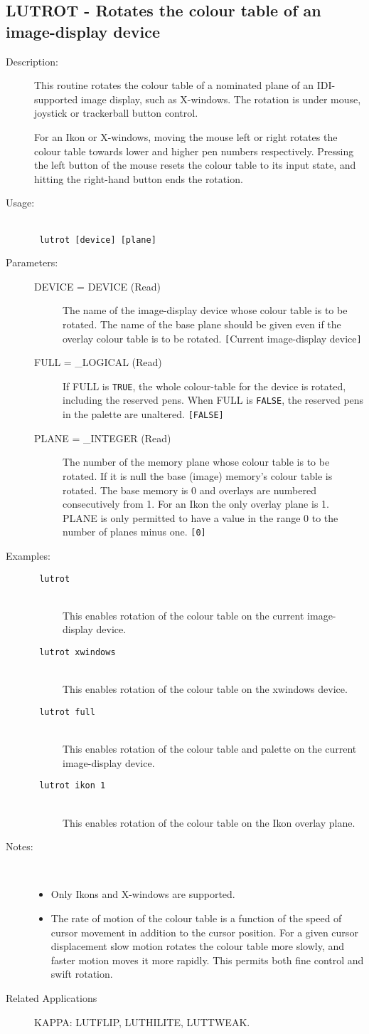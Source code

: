 \documentclass[twoside,11pt]{article}
\newcommand{\stardocinitials}  {SUN}
\newcommand{\stardocnumber}    {239.2}
\newcommand{\stardocname}{\stardocinitials /\stardocnumber}
\newcommand{\htmlref}[2]{#1}
\newcommand{\xlabel}[1]{}
\newlength{\sstbannerlength}
\newlength{\sstcaptionlength}
\newlength{\sstexampleslength}
\newlength{\sstexampleswidth}
\newcommand{\sstroutine}[3]{
   \goodbreak
   \markboth{{\stardocname}~ --- #1}{{\stardocname}~ --- #1}
   \rule{\textwidth}{0.5mm}
   \vspace{-7ex}
   \newline
   \settowidth{\sstbannerlength}{{\Large {\bf #1}}}
   \setlength{\sstcaptionlength}{\textwidth}
   \setlength{\sstexampleslength}{\textwidth}
   \addtolength{\sstbannerlength}{0.5em}
   \addtolength{\sstcaptionlength}{-2.0\sstbannerlength}
   \addtolength{\sstcaptionlength}{-4.9pt}
   \settowidth{\sstexampleswidth}{{\bf Examples:}}
   \addtolength{\sstexampleslength}{-\sstexampleswidth}
   \parbox[t]{\sstbannerlength}{\flushleft{\Large {\bf #1}}}
   \parbox[t]{\sstcaptionlength}{\center{\Large #2}}
   \parbox[t]{\sstbannerlength}{\flushright{\Large {\bf #1}}}
   \begin{description}
      #3
   \end{description}
}
\newcommand{\sstdescription}[1]{\item[Description:] #1}
\newcommand{\sstusage}[1]{\pagebreak[3] \item[Usage:] \mbox{} \\[1.3ex] {\ssttt #1}}
\newcommand{\sstparameters}[1]{
   \goodbreak 
   \item[Parameters:] \mbox{} \\
   \vspace{-3.5ex}
   \begin{description}
      #1
   \end{description}
}
\newcommand{\sstexamples}[1]{
   \goodbreak
   \item[Examples:] \mbox{} \\
   \vspace{-3.5ex}
   \begin{description}
      #1
   \end{description}
}
\newcommand{\sstsubsection}[1]{ \item[{#1}] \mbox{} \\}
\newcommand{\sstexamplesubsection}[2]{\sloppy \item{\ssttt #1} \mbox{} \\ #2 }
\newcommand{\sstnotes}[1]{\pagebreak[3] \item[Notes:] \mbox{} \\[1.3ex] #1}
\newcommand{\sstdiytopic}[2]{\goodbreak \item[{\hspace{-0.35em}#1\hspace{-0.35em}:}] \mbox{} \\[1.3ex] #2}
\newenvironment{sstitemize}{%
  \vspace{-4.3ex}\begin{itemize}}{\end{itemize}}
\newcommand{\sstitemlist}[1]{
  \mbox{} \\
  \vspace{-3.5ex}
  \begin{sstitemize}
     #1
  \end{sstitemize}
}
\newcommand{\sstitem}{\item}
\newcommand{\ssttt}{\tt}
\renewcommand{\sstroutine}[3]{
      \subsection{#1\xlabel{#1}-\label{#1}#2}
      \begin{description}
         #3
      \end{description}
   }
\renewcommand{\sstdescription}[1]{\item[Description:]
      \begin{description}
         #1
      \end{description}
   }
\renewcommand{\sstusage}[1]{\htmlref{\item[Usage:]}{ap:usage} \mbox{} \\ {\ssttt #1}}
\renewcommand{\sstparameters}[1]{
      \htmlref{\item[Parameters:]}{se:param}
      \begin{description}
         #1
      \end{description}
   }
\renewcommand{\sstexamples}[1]{
      \htmlref{\item[Examples:]}{ap:example}
      \begin{description}
         #1
      \end{description}
   }
\renewcommand{\sstsubsection}[1]{\item[{#1}]}
\renewcommand{\sstexamplesubsection}[2]{\item[{\ssttt #1}] \\ #2}
\renewcommand{\sstnotes}[1]{\item[Notes:]
      \begin{description}
         #1
      \end{description}
   }
\renewcommand{\sstdiytopic}[2]{\item[{#1}]
      \begin{description}
         #2
      \end{description}
   }
\newcommand{\sstitemlist}[1]{
      \begin{itemize}
         #1
      \end{itemize}
   }
\begin{document}
\sstroutine{
   LUTROT
}{
   Rotates the colour table of an image-display device
}{
   \sstdescription{
      This routine rotates the colour table of a nominated plane of
      an IDI-supported image display, such as X-windows. The rotation
      is under mouse, joystick or trackerball button control.

      For an Ikon or X-windows, moving the mouse left or right
      rotates the colour table towards lower and higher pen numbers
      respectively.  Pressing the left button of the mouse resets the
      colour table to its input state, and hitting the right-hand
      button ends the rotation.
   }
   \sstusage{
      lutrot [device] [plane]
   }
   \sstparameters{
      \sstsubsection{
         DEVICE = DEVICE (Read)
      }{
         The name of the image-display device whose colour table is to
         be rotated.  The name of the base plane should be given even if
         the overlay colour table is to be rotated.
         {\tt [}Current image-display device{\tt ]}
      }
      \sstsubsection{
         FULL = \_LOGICAL (Read)
      }{
         If FULL is {\tt TRUE}, the whole colour-table for the device is
         rotated, including the reserved pens.  When FULL is {\tt FALSE},
         the reserved pens in the palette are unaltered. 
         {\tt [FALSE]}
      }
      \sstsubsection{
         PLANE = \_INTEGER (Read)
      }{
         The number of the memory plane whose colour table is to be
         rotated. If it is null the base (image) memory's colour table
         is rotated. The base memory is 0 and overlays are numbered
         consecutively from 1.  For an Ikon the only overlay plane is 1.
         PLANE is only permitted to have a value in the range 0 to the
         number of planes minus one. {\tt [0]}
      }
   }
   \sstexamples{
      \sstexamplesubsection{
         lutrot
      }{
         This enables rotation of the colour table on the current
         image-display device.
      }
      \sstexamplesubsection{
         lutrot xwindows
      }{
         This enables rotation of the colour table on the xwindows
         device.
      }
      \sstexamplesubsection{
         lutrot full
      }{
         This enables rotation of the colour table and palette on the
         current image-display device.
      }
      \sstexamplesubsection{
         lutrot ikon 1
      }{
         This enables rotation of the colour table on the Ikon overlay
         plane.
      }
   }
   \sstnotes{
      \sstitemlist{

         \sstitem
         Only Ikons and X-windows are supported.

         \sstitem
         The rate of motion of the colour table is a function of the
         speed of cursor movement in addition to the cursor position.
         For a given cursor displacement slow motion rotates the colour
         table more slowly, and faster motion moves it more rapidly.  This
         permits both fine control and swift rotation.
      }
   }
   \sstdiytopic{
      Related Applications
   }{
      KAPPA: LUTFLIP, LUTHILITE, LUTTWEAK.
   }
}
\end{document}
